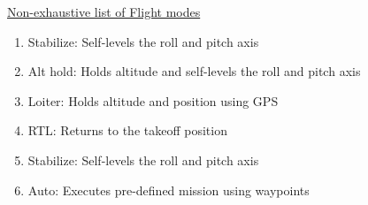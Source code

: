 \underline{Non-exhaustive list of Flight modes}

\begin{enumerate}

    \item Stabilize: Self-levels the roll and pitch axis
    
    \item Alt hold: Holds altitude and self-levels the roll and pitch axis
    
    \item Loiter: Holds altitude and position using GPS
    
    \item RTL: Returns to the takeoff position
    
    \item Stabilize: Self-levels the roll and pitch axis
    
    \item Auto: Executes pre-defined mission using waypoints
    
\end{enumerate}



